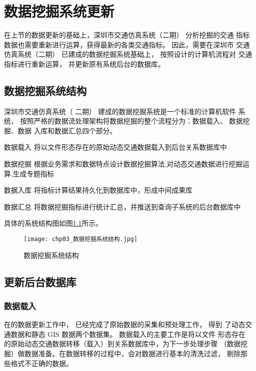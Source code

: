 

\chapter{数据挖掘系统更新}
在上节的数据更新的基础上，深圳市交通仿真系统（二期） 分析挖掘的交通
指标数据也需要重新进行运算，获得最新的各类交通指标。 因此，需要在深圳市
交通仿真系统（二期） 已建成的数据挖掘系统基础上， 按照设计的计算机流程对
交通指标进行重新运算， 并更新原有系统后台的数据库。

\section{数据挖掘系统结构}
深圳市交通仿真系统（ 二期） 建成的数据挖掘系统是一个标准的计算机软件
系统， 按照严格的数据流处理架构将数据挖掘的整个流程分为：数据载入、 数据挖掘、数据
入库和数据汇总四个部分。 

\begin{para}
\item[数据载入] 将以文件形态存在的原始动态交通数据载入到后台关系数据库中
\item[数据挖掘] 根据业务需求和数据特点设计数据挖掘算法,对动态交通数据进行挖掘运算,生成专题指标 
\item[数据入库] 将指标计算结果持久化到数据库中，形成中间成果库
\item[数据汇总] 将数据挖掘指标进行统计汇总，并推送到查询子系统的后台数据库中
\end{para}

具体的系统结构图如图\ref{fig:chp03_数据挖掘系统结构}所示。

\begin{figure}[ht]
  \centering
  \texttt{[image: chp03\_数据挖掘系统结构.jpg]}
  \caption{数据挖掘系统结构\label{fig:chp03_数据挖掘系统结构} }
\end{figure}

\section{更新后台数据库}
\subsection{数据载入}
在的数据更新工作中， 已经完成了原始数据的采集和预处理工作， 得到
了动态交通数据和静态 GIS 数据两个数据集。 数据载入的主要工作是将以文件
形态存在的原始动态交通数据转移（载入）到关系数据库中，为下一步处理步骤
（数据挖掘）做数据准备。在数据转移的过程中，会对数据进行基本的清洗过滤，
剔除那些格式不正确的数据。


